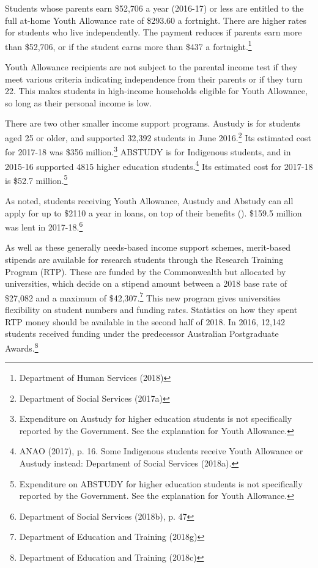 \documentclass{grattan}
\begin{document}
Students whose parents earn \$52,706 a year (2016-17) or less are entitled to the full at-home Youth Allowance rate of \$293.60 a fortnight. There are higher rates for students who live independently. The payment reduces if parents earn more than \$52,706, or if the student earns more than \$437 a fortnight.\footnote{Department of Human Services (2018)}

Youth Allowance recipients are not subject to the parental income test if they meet various criteria indicating independence from their parents or if they turn 22. This makes students in high-income households eligible for Youth Allowance, so long as their personal income is low.

There are two other smaller income support programs. Austudy is for students aged 25 or older, and supported 32,392 students in June 2016.\footnote{Department of Social Services (2017a)} Its estimated cost for 2017-18 was \$356 million.\footnote{Expenditure on Austudy for higher education students is not specifically reported by the Government. See the explanation for Youth Allowance.} ABSTUDY is for Indigenous students, and in 2015-16 supported 4815 higher education students.\footnote{ANAO (2017), p. 16. Some Indigenous students receive Youth Allowance or Austudy instead: Department of Social Services (2018a).} Its estimated cost for 2017-18 is \$52.7 million.\footnote{Expenditure on ABSTUDY for higher education students is not specifically reported by the Government. See the explanation for Youth Allowance.}

As noted, students receiving Youth Allowance, Austudy and Abstudy can all apply for up to \$2110 a year in loans, on top of their benefits (). \$159.5 million was lent in 2017-18.\footnote{Department of Social Services (2018b), p. 47}

As well as these generally needs-based income support schemes, merit-based stipends are available for research students through the Research Training Program (RTP). These are funded by the Commonwealth but allocated by universities, which decide on a stipend amount between a 2018 base rate of \$27,082 and a maximum of \$42,307.\footnote{Department of Education and Training (2018g)} This new program gives universities flexibility on student numbers and funding rates. Statistics on how they spent RTP money should be available in the second half of 2018. In 2016, 12,142 students received funding under the predecessor Australian Postgraduate Awards.\footnote{Department of Education and Training (2018c)}
\end{document}
